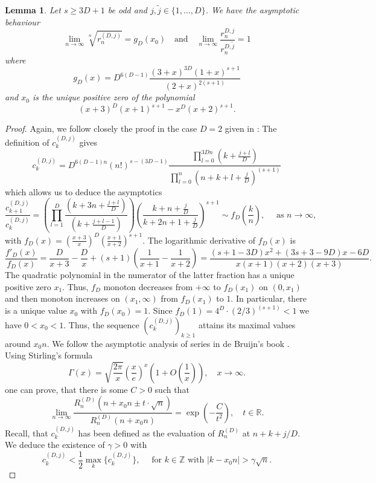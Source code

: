 \documentclass[11pt]{amsart}
\theoremstyle{plain}
\newtheorem{lem}[thm]{Lemma}
\theoremstyle{remark}
\theoremstyle{definition}
\newcommand{\ZZ}{\mathbb{Z}}
\begin{document}
\begin{lem}\label{lem6}
Let $s\geq 3D+1 $ be odd and $j,\tilde{j}\in\{1,...,D\}$. We have the asymptotic behaviour
\[
	\lim_{n\rightarrow \infty} \sqrt[n]{r_n^{(D,j)}}=g_D(x_0)\quad \text{and} \quad \lim_{n\rightarrow \infty}\frac{r^{D,j}_n}{r^{D,\tilde{j}}_n}=1
\]
where
\[
g_D(x)=D^{6(D-1)}\frac{(3+x)^{3D}(1+x)^{s+1}}{(2+x)^{2(s+1)}}
\]
and $x_0$ is the unique positive zero of the polynomial
\[
	(x+3)^D(x+1)^{s+1}-x^D(x+2)^{s+1}.
\]
\end{lem}
\begin{proof}Again, we follow closely the proof in the case $D=2$ given in \cite[Lemma 4]{zudilin}:	The definition of $c_k^{(D,j)}$ gives
	\[
		c_k^{(D,j)}=D^{6(D-1)n}(n!)^{s-(3D-1)}\frac{\prod_{l=0}^{3Dn}(k+\frac{j+l}{D})}{\prod_{l=0}^{n}(n+k+l+\frac{j}{D})^{(s+1)}}
	\]
	which allows us to deduce the asymptotics
	\[
		\frac{c^{(D,j)}_{k+1}}{c^{(D,j)}_k}	=\left(\prod_{l=1}^D\frac{(k+3n+\frac{j+l}{D})}{(k+\frac{j+l-1}{D})}\right)\left( \frac{k+n+\frac{j}{D}}{k+2n+1+\frac{j}{D}}\right)^{s+1}\sim f_D\left(\frac{k}{n}\right),\quad \text{ as }n\rightarrow\infty,
	\]
	with $f_D(x)=\left(\frac{x+3}{x}\right)^D\left(\frac{x+1}{x+2}\right)^{s+1}$. The logarithmic derivative of $f_D(x)$ is
	\[
		\frac{f'_D(x)}{f_D(x)}=\frac{D}{x+3}-\frac{D}{x}+(s+1)\left(\frac{1}{x+1}-\frac{1}{x+2} \right)=\frac{(s+1-3D)x^2+(3s+3-9D)x-6D}{x(x+1)(x+2)(x+3)}.
	\]
	The quadratic polynomial in the numerator of the latter fraction has a unique positive zero $x_1$. Thus, $f_D$ monoton decreases from $+\infty$ to $f_D(x_1)$ on $(0,x_1)$ and then monoton increases on $(x_1,\infty)$ from $f_D(x_1)$ to $1$. In particular, there is a unique value $x_0$ with $f_D(x_0)=1$. Since $f_D(1)=4^D\cdot(2/3)^{(s+1)}<1$ we have $0<x_0<1$. Thus, the sequence $(c_k^{(D,j)})_{k\geq 1}$ attains its maximal values around $x_0n$. We follow the asymptotic analysis of series in de Bruijn's book \cite[\S 3.4]{deBruijn}. Using Stirling's formula
\[
	\Gamma(x)=\sqrt{\frac{2\pi}{x}}\left(\frac{x}{e}\right)^x\left(1+O\left( \frac{1}{x} \right)\right),\quad x\rightarrow \infty.
\]
	one can prove, that there is some $C>0$ such that
	 \[
	 	\lim_{n\rightarrow\infty} \frac{R_n^{(D)}\left( n+x_0n\pm t\cdot \sqrt{n} \right)}{R_n^{(D)}\left( n+x_0n\right)}=\exp\left( -\frac{C}{t^2} \right),\quad t\in\mathbb{R}.
	 \]
	Recall, that $c_{k}^{(D,j)}$ has been defined as the evaluation of $R_n^{(D)}$ at $n+k+j/D$. We deduce the existence of $\gamma>0$ with
	\[
		c_{k}^{(D,j)}<\frac{1}{2}\max_k\{c_{k}^{(D,j)}\},\quad \text{ for $k\in\ZZ$ with } |k-x_0n|>\gamma \sqrt{n}.
	\]

\end{proof}
\end{document}
